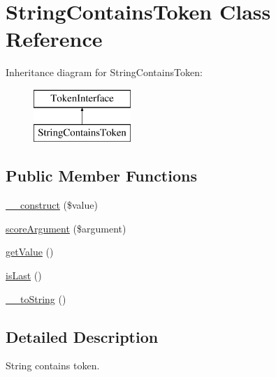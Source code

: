 \hypertarget{class_prophecy_1_1_argument_1_1_token_1_1_string_contains_token}{}\section{String\+Contains\+Token Class Reference}
\label{class_prophecy_1_1_argument_1_1_token_1_1_string_contains_token}
Inheritance diagram for String\+Contains\+Token\+:\begin{figure}[H]
\begin{center}
\leavevmode
\includegraphics[height=2.000000cm]{class_prophecy_1_1_argument_1_1_token_1_1_string_contains_token}
\end{center}
\end{figure}
\subsection*{Public Member Functions}
\begin{DoxyCompactItemize}
\item 
\mbox{\hyperlink{class_prophecy_1_1_argument_1_1_token_1_1_string_contains_token_a7e17a19b592345a03763f050fffe0ce7}{\+\_\+\+\_\+construct}} (\$value)
\item 
\mbox{\hyperlink{class_prophecy_1_1_argument_1_1_token_1_1_string_contains_token_a8d5bf47ab6eaa935458d5ad160e52822}{score\+Argument}} (\$argument)
\item 
\mbox{\hyperlink{class_prophecy_1_1_argument_1_1_token_1_1_string_contains_token_ac0bc18784b182c89fcfd276625aef435}{get\+Value}} ()
\item 
\mbox{\hyperlink{class_prophecy_1_1_argument_1_1_token_1_1_string_contains_token_ac72b8349b1340887fc1af30eca2b951c}{is\+Last}} ()
\item 
\mbox{\hyperlink{class_prophecy_1_1_argument_1_1_token_1_1_string_contains_token_a7516ca30af0db3cdbf9a7739b48ce91d}{\+\_\+\+\_\+to\+String}} ()
\end{DoxyCompactItemize}


\subsection{Detailed Description}
String contains token.

